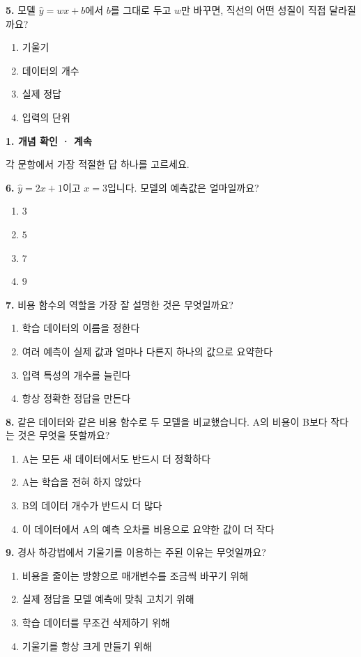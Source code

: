 \documentclass[11pt,a4paper]{article}
\newcommand{\parttitle}[2]{{\large\bfseries\color{ink} #1}\par{\small #2}\par\vspace{5mm}}
\newcommand{\question}[2]{\textbf{#1.} #2\par}
\begin{document}
\question{5}{모델 $\hat y=wx+b$에서 $b$를 그대로 두고 $w$만 바꾸면, 직선의 어떤 성질이 직접 달라질까요?}
\begin{enumerate}[label=(\arabic*),leftmargin=9mm,itemsep=0pt,topsep=2pt,parsep=0pt]
\item 기울기
\item 데이터의 개수
\item 실제 정답
\item 입력의 단위
\end{enumerate}\vfill
\newpage
\parttitle{1. 개념 확인 · 계속}{각 문항에서 가장 적절한 답 하나를 고르세요.}
\question{6}{$\hat y=2x+1$이고 $x=3$입니다. 모델의 예측값은 얼마일까요?}
\begin{enumerate}[label=(\arabic*),leftmargin=9mm,itemsep=0pt,topsep=2pt,parsep=0pt]
\item $3$
\item $5$
\item $7$
\item $9$
\end{enumerate}\vfill
\question{7}{비용 함수의 역할을 가장 잘 설명한 것은 무엇일까요?}
\begin{enumerate}[label=(\arabic*),leftmargin=9mm,itemsep=0pt,topsep=2pt,parsep=0pt]
\item 학습 데이터의 이름을 정한다
\item 여러 예측이 실제 값과 얼마나 다른지 하나의 값으로 요약한다
\item 입력 특성의 개수를 늘린다
\item 항상 정확한 정답을 만든다
\end{enumerate}\vfill
\question{8}{같은 데이터와 같은 비용 함수로 두 모델을 비교했습니다. A의 비용이 B보다 작다는 것은 무엇을 뜻할까요?}
\begin{enumerate}[label=(\arabic*),leftmargin=9mm,itemsep=0pt,topsep=2pt,parsep=0pt]
\item A는 모든 새 데이터에서도 반드시 더 정확하다
\item A는 학습을 전혀 하지 않았다
\item B의 데이터 개수가 반드시 더 많다
\item 이 데이터에서 A의 예측 오차를 비용으로 요약한 값이 더 작다
\end{enumerate}\vfill
\question{9}{경사 하강법에서 기울기를 이용하는 주된 이유는 무엇일까요?}
\begin{enumerate}[label=(\arabic*),leftmargin=9mm,itemsep=0pt,topsep=2pt,parsep=0pt]
\item 비용을 줄이는 방향으로 매개변수를 조금씩 바꾸기 위해
\item 실제 정답을 모델 예측에 맞춰 고치기 위해
\item 학습 데이터를 무조건 삭제하기 위해
\item 기울기를 항상 크게 만들기 위해
\end{enumerate}\vfill
\end{document}
